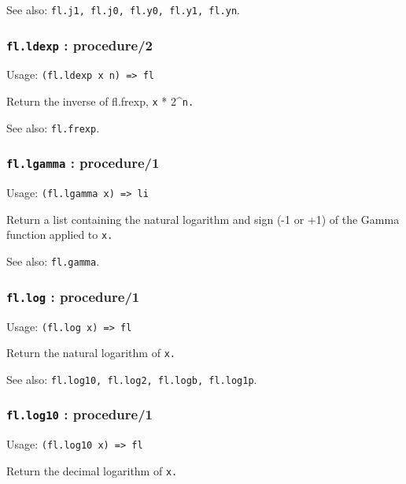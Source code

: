 \documentclass[
]{article}
\newcommand{\passthrough}[1]{#1}
\begin{document}
See also: \passthrough{\lstinline!fl.j1, fl.j0, fl.y0, fl.y1, fl.yn!}.

\hypertarget{fl.ldexp-procedure2}{%
\subsubsection{\texorpdfstring{\texttt{fl.ldexp} :
procedure/2}{fl.ldexp : procedure/2}}\label{fl.ldexp-procedure2}}

Usage: \passthrough{\lstinline!(fl.ldexp x n) => fl!}

Return the inverse of fl.frexp, \passthrough{\lstinline!x!} *
2\^{}\passthrough{\lstinline!n.!}

See also: \passthrough{\lstinline!fl.frexp!}.

\hypertarget{fl.lgamma-procedure1}{%
\subsubsection{\texorpdfstring{\texttt{fl.lgamma} :
procedure/1}{fl.lgamma : procedure/1}}\label{fl.lgamma-procedure1}}

Usage: \passthrough{\lstinline!(fl.lgamma x) => li!}

Return a list containing the natural logarithm and sign (-1 or +1) of
the Gamma function applied to \passthrough{\lstinline!x.!}

See also: \passthrough{\lstinline!fl.gamma!}.

\hypertarget{fl.log-procedure1}{%
\subsubsection{\texorpdfstring{\texttt{fl.log} :
procedure/1}{fl.log : procedure/1}}\label{fl.log-procedure1}}

Usage: \passthrough{\lstinline!(fl.log x) => fl!}

Return the natural logarithm of \passthrough{\lstinline!x.!}

See also:
\passthrough{\lstinline!fl.log10, fl.log2, fl.logb, fl.log1p!}.

\hypertarget{fl.log10-procedure1}{%
\subsubsection{\texorpdfstring{\texttt{fl.log10} :
procedure/1}{fl.log10 : procedure/1}}\label{fl.log10-procedure1}}

Usage: \passthrough{\lstinline!(fl.log10 x) => fl!}

Return the decimal logarithm of \passthrough{\lstinline!x.!}
\end{document}
